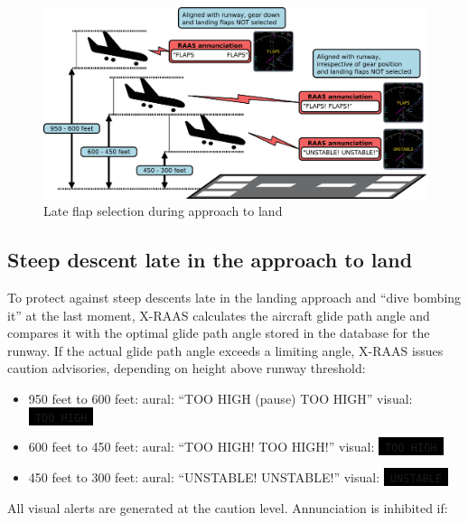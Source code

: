 \documentclass[a4paper,12pt]{article}
\newcommand{\visualadvisory}[3][b]{%
    \ifthenelse{\equal{#1}{b}}{\begin{center}}{}
    \noindent
    \colorbox{black}{\textcolor{#2visualadvisorycolor}{\large\texttt{~#3~}}}
    \ifthenelse{\equal{#1}{b}}{\end{center}}{}}
\begin{document}
\begin{figure}[H]
\begin{center}
\includegraphics[width=\textwidth]{../src/apch_flaps.pdf}
\end{center}
\caption{Late flap selection during approach to land}
\end{figure}

\subsection{Steep descent late in the approach to land}
\label{subsec:TooHighMon}

To protect against steep descents late in the landing approach and ``dive
bombing it'' at the last moment, X-RAAS calculates the aircraft glide
path angle and compares it with the optimal glide path angle stored in
the database for the runway. If the actual glide path angle exceeds a
limiting angle, X-RAAS issues caution advisories, depending on height
above runway threshold:

\begin{itemize}

\item 950 feet to 600 feet: aural: ``TOO HIGH (pause) TOO HIGH''
visual:\visualadvisory[i]{nonroutine}{TOO HIGH}

\item 600 feet to 450 feet: aural: ``TOO HIGH! TOO HIGH!''
visual:\visualadvisory[i]{nonroutine}{TOO HIGH}

\item 450 feet to 300 feet: aural: ``UNSTABLE! UNSTABLE!''
visual:\visualadvisory[i]{nonroutine}{UNSTABLE}

\end{itemize}

\noindent All visual alerts are generated at the caution level.
Annunciation is inhibited if:
\end{document}
